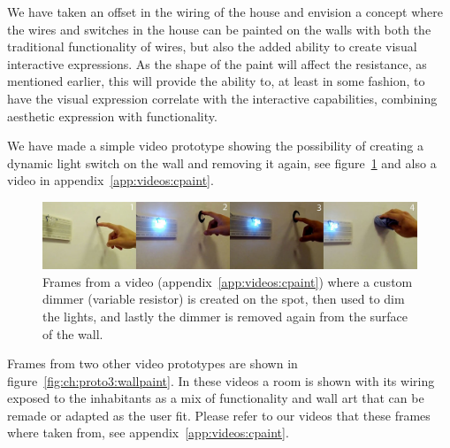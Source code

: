 We have taken an offset in the wiring of the house and envision a concept where the wires and switches in the house can be painted on the walls with both the traditional functionality of wires, but also the added ability to create visual interactive expressions.
As the shape of the paint will affect the resistance, as mentioned earlier, this will provide the ability to, at least in some fashion, to have the visual expression correlate with the interactive capabilities, combining aesthetic expression with functionality.

We have made a simple video prototype showing the possibility of creating a dynamic light switch on the wall and removing it again, see figure~\ref{fig:ch:proto3:variable} and also a video in appendix~\ref{app:videos:cpaint}.

\begin{figure}[h]
  \centering
  \includegraphics[width=.9\textwidth]{figures/proto3/light-variable-res}
  \caption{Frames from a video (appendix~\ref{app:videos:cpaint}) where a custom dimmer (variable resistor) is created on the spot, then used to dim the lights, and lastly the dimmer is removed again from the surface of the wall.}
  \label{fig:ch:proto3:variable}
\end{figure}

Frames from two other video prototypes are shown in figure~\ref{fig:ch:proto3:wallpaint}.
In these videos a room is shown with its wiring exposed to the inhabitants as a mix of functionality and wall art that can be remade or adapted as the user fit.
Please refer to our videos that these frames where taken from, see appendix~\ref{app:videos:cpaint}.

